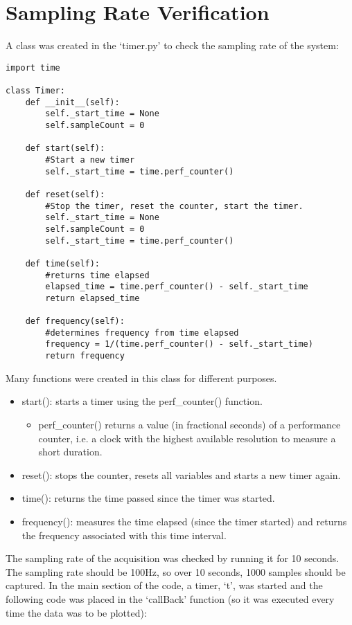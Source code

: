 \documentclass{article}
\begin{document}
\section{Sampling Rate Verification}
A class was created in the `timer.py' to check the sampling rate of the system:
\begin{lstlisting}
import time

class Timer:
    def __init__(self):
        self._start_time = None
        self.sampleCount = 0

    def start(self):
        #Start a new timer
        self._start_time = time.perf_counter()

    def reset(self):
        #Stop the timer, reset the counter, start the timer.
        self._start_time = None
        self.sampleCount = 0
        self._start_time = time.perf_counter()

    def time(self):
        #returns time elapsed
        elapsed_time = time.perf_counter() - self._start_time
        return elapsed_time
    
    def frequency(self):
        #determines frequency from time elapsed
        frequency = 1/(time.perf_counter() - self._start_time)
        return frequency
\end{lstlisting}
Many functions were created in this class for different purposes.
\begin{itemize}
  \item start(): starts a timer using the perf\_counter() function.
  \begin{itemize}
  \item perf\_counter() returns a value (in fractional seconds) of a performance counter, i.e. a clock with the highest available resolution to measure a short duration.
  \end{itemize}  
  \item reset(): stops the counter, resets all variables and starts a new timer again.
  \item time(): returns the time passed since the timer was started.
  \item frequency(): measures the time elapsed (since the timer started) and returns the frequency associated with this time interval.
\end{itemize}
The sampling rate of the acquisition was checked by running it for 10 seconds.\newline
The sampling rate should be 100Hz, so over 10 seconds, 1000 samples should be captured. In the main section of the code, a timer, `t', was started and the following code was placed in the `callBack' function (so it was executed every time the data was to be plotted):
\end{document}

